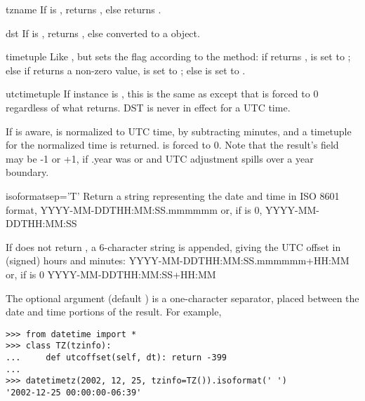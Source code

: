 \begin{methoddesc}{tzname}{}
    If  is , returns , else
    returns .
\end{methoddesc}

\begin{methoddesc}{dst}{}
    If  is , returns , else
     converted to a 
    object.
\end{methoddesc}

\begin{methoddesc}{timetuple}{}
    Like , but sets the
     flag according to the  method:  if
     returns ,  is set to
    ; else if  returns a non-zero value,
     is set to ; else  is set
    to .
\end{methoddesc}

\begin{methoddesc}{utctimetuple}{}
    If  instance  is \naive, this is the same as
     except that  is forced to 0
    regardless of what  returns.  DST is never in effect
    for a UTC time.

    If  is aware,  is normalized to UTC time, by subtracting
     minutes, and a timetuple for the
    normalized time is returned.   is forced to 0.
    Note that the result's  field may be
    -1 or +1, if .year was
     or  and UTC adjustment spills over a
    year boundary.
\end{methoddesc}

\begin{methoddesc}{isoformat}{sep='T'}
    Return a string representing the date and time in ISO 8601 format,
        YYYY-MM-DDTHH:MM:SS.mmmmmm
    or, if  is 0,
        YYYY-MM-DDTHH:MM:SS

    If  does not return , a 6-character
    string is appended, giving the UTC offset in (signed) hours and
    minutes:
        YYYY-MM-DDTHH:MM:SS.mmmmmm+HH:MM
    or, if  is 0
        YYYY-MM-DDTHH:MM:SS+HH:MM

    The optional argument  (default ) is a
    one-character separator, placed between the date and time portions
    of the result.  For example,

\begin{verbatim}
>>> from datetime import *
>>> class TZ(tzinfo):
...     def utcoffset(self, dt): return -399
...
>>> datetimetz(2002, 12, 25, tzinfo=TZ()).isoformat(' ')
'2002-12-25 00:00:00-06:39'
\end{verbatim}
\end{methoddesc}

